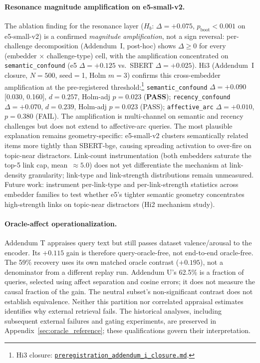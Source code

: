 \documentclass[11pt]{article}
\newcommand{\repourl}{https://github.com/gianlucamazza/emotional-memory}%
\begin{document}
\paragraph{Resonance magnitude amplification on e5-small-v2.}
The ablation finding for the resonance layer ($H_b$: $\Delta=+0.075$,
$p_{\text{boot}}<0.001$ on e5-small-v2) is a confirmed \emph{magnitude amplification}, not
a sign reversal: per-challenge decomposition (Addendum~I, post-hoc) shows
$\Delta \geq 0$ for every (embedder $\times$ challenge-type) cell, with the
amplification concentrated on \texttt{semantic\_confound} (e5 $\Delta=+0.125$
vs.\ SBERT $\Delta=+0.025$).
Hi3 (Addendum~I closure, $N=500$, seed$=$1, Holm $m=3$) confirms this
cross-embedder amplification at the pre-registered threshold:\footnote{%
Hi3 closure:
\href{\repourl/blob/main/benchmarks/preregistration\_addendum\_i\_closure.md}%
{\texttt{preregistration\_addendum\_i\_closure.md}}.}
\texttt{semantic\_confound} $\Delta=+0.090$ [0.030, 0.160], $d=0.257$,
Holm-adj $p=0.023$ (\textbf{PASS}); \texttt{recency\_confound} $\Delta=+0.070$,
$d=0.239$, Holm-adj $p=0.023$ (PASS); \texttt{affective\_arc} $\Delta=+0.010$,
$p=0.380$ (FAIL).
The amplification is multi-channel on semantic and recency challenges but does
not extend to affective-arc queries.
The most plausible explanation remains geometry-specific: e5-small-v2 clusters
semantically related items more tightly than SBERT-bge, causing spreading
activation to over-fire on topic-near distractors.
Link-count instrumentation (both embedders saturate the top-5 link cap,
mean~$\approx 5.0$) does not yet differentiate the mechanism at link-density
granularity; link-type and link-strength distributions remain unmeasured.
Future work: instrument per-link-type and per-link-strength statistics
across embedder families to test whether e5's tighter semantic geometry
concentrates high-strength links on topic-near distractors (Hi2 mechanism
study).

\paragraph{Oracle-affect operationalization.}
Addendum T appraises query text but still passes dataset valence/arousal to the
encoder. Its $+0.115$ gain is therefore query-oracle-free, not end-to-end
oracle-free. The 59\% recovery uses its own matched oracle contrast ($+0.195$),
not a denominator from a different replay run. Addendum U's 62.5\% is a fraction
of queries, selected using affect separation and cosine errors; it does not
measure the causal fraction of the gain. The neutral subset's non-significant
contrast does not establish equivalence. Neither this partition nor correlated
appraisal estimates identifies why external retrieval fails.
The historical analyses, including subsequent external failures and gating
experiments, are preserved in Appendix~\ref{sec:oracle_reference}; these
qualifications govern their interpretation.
\end{document}
